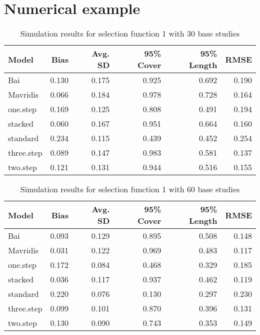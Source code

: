 \documentclass[12pt]{article}   	%
\numberwithin{equation}{section}
\begin{document}
\section{Numerical example} \label{sec:numex}





\begin{table}[ht]
\centering
\begin{tabular}{lrrrrr}
  \hline
Model & Bias & Avg. SD & 95\% Cover & 95\% Length & RMSE \\ 
  \hline
Bai & 0.130 & 0.175 & 0.925 & 0.692 & 0.190 \\ 
  Mavridis & 0.066 & 0.184 & 0.978 & 0.728 & 0.164 \\ 
  one.step & 0.169 & 0.125 & 0.808 & 0.491 & 0.194 \\ 
  stacked & 0.060 & 0.167 & 0.951 & 0.664 & 0.160 \\ 
  standard & 0.234 & 0.115 & 0.439 & 0.452 & 0.254 \\ 
  three.step & 0.089 & 0.147 & 0.983 & 0.581 & 0.137 \\ 
  two.step & 0.121 & 0.131 & 0.944 & 0.516 & 0.155 \\ 
   \hline
\end{tabular}
\caption{Simulation results for selection function 1 with 30 base studies}
\end{table}

\begin{table}[ht]
\centering
\begin{tabular}{lrrrrr}
  \hline
Model & Bias & Avg. SD & 95\% Cover & 95\% Length & RMSE \\ 
  \hline
Bai & 0.093 & 0.129 & 0.895 & 0.508 & 0.148 \\ 
  Mavridis & 0.031 & 0.122 & 0.969 & 0.483 & 0.117 \\ 
  one.step & 0.172 & 0.084 & 0.468 & 0.329 & 0.185 \\ 
  stacked & 0.036 & 0.117 & 0.937 & 0.462 & 0.119 \\ 
  standard & 0.220 & 0.076 & 0.130 & 0.297 & 0.230 \\ 
  three.step & 0.099 & 0.101 & 0.870 & 0.396 & 0.131 \\ 
  two.step & 0.130 & 0.090 & 0.743 & 0.353 & 0.149 \\ 
   \hline
\end{tabular}
\caption{Simulation results for selection function 1 with 60 base studies}
\end{table}





\end{document}
